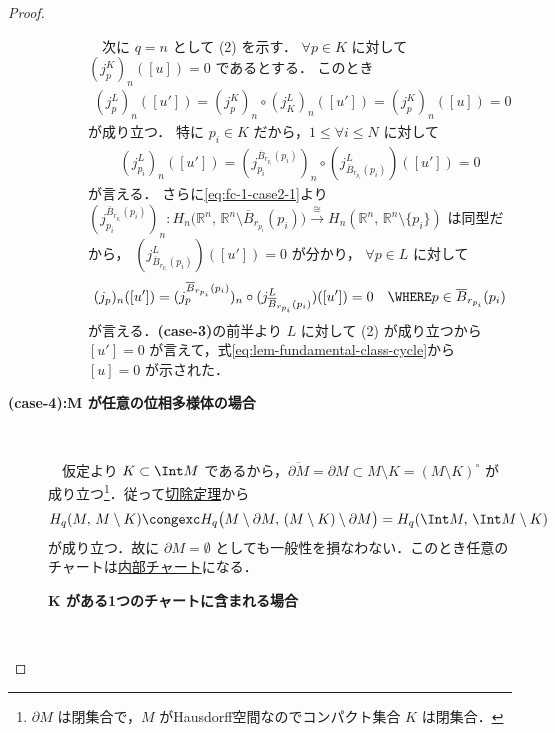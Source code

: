 \documentclass[algtopo_main]{subfiles}
\begin{document}
\begin{proof}
\begin{description}
\begin{description}
            　次に $q = n$ として (2) を示す．
            $\forall p \in K$ に対して $(j_p^K)_n ([u]) = 0$ であるとする．
            このとき
            \begin{align}
                (j_p^L)_n([u']) = (j_p^K)_n \circ (j_K^L)_n([u']) = (j_p^K)_n([u]) = 0
            \end{align}
            が成り立つ．
            特に $p_i \in K$ だから，$1 \le \forall i \le N$ に対して
            \begin{align}
                (j_{p_i}^L)_n ([u']) = (j_{p_i}^{\overline{B}_{r_{p_i}}(p_i)})_n \circ (j_{\overline{B}_{r_{p_i}}(p_i)}^L) ([u']) = 0
            \end{align}
            が言える．
            さらに\eqref{eq:fc-1-case2-1}より $(j_{p_i}^{\overline{B}_{r_{p_i}}(p_i)})_n \colon H_n \bigl( \mathbb{R}^n,\, \mathbb{R}^n \setminus \overline{B}_{r_{p_i}}(p_i) \bigr)  \xrightarrow{\cong} H_n (\mathbb{R}^n,\, \mathbb{R}^n \setminus \{p_i\})$ は同型だから，
            $(j_{\overline{B}_{r_{p_i}}(p_i)}^L) ([u']) = 0$ が分かり，
            $\forall p \in L$ に対して
            \begin{align}
                (j_p)_n([u']) = (j_p^{\overline{B}_{r_{p_i}}(p_i)})_n \circ (j_{\overline{B}_{r_{p_i}}(p_i)}^L)([u']) = 0 \quad \WHERE p \in \overline{B}_{r_{p_i}}(p_i)
            \end{align}
            が言える．\textbf{\textsf{(case-3)}}の前半より $L$ に対して (2) が成り立つから $[u'] = 0$ が言えて，式\eqref{eq:lem-fundamental-class-cycle}から $[u] = 0$ が示された．
        
        \end{description}
    
        \item[\textbf{(case-4):$\bm{M}$ が任意の位相多様体の場合}]　
        
        　仮定より $K \subset \Int M$ であるから，$\overline{\partial M} = \partial M \subset M \setminus K = (M \setminus K)^\circ$ が成り立つ\footnote{$\partial M$ は閉集合で，$M$ がHausdorff空間なのでコンパクト集合 $K$ は閉集合．}．従って\hyperref[thm:exc]{切除定理}から
        \begin{align}
            H_q (M,\, M \setminus K) \congexc H_q\bigl(M \setminus \partial M,\, (M \setminus K) \setminus \partial M\bigr) = H_q(\Int M ,\, \Int M \setminus K)
        \end{align}
        が成り立つ．故に $\partial M = \emptyset$ としても一般性を損なわない．このとき任意のチャートは\hyperref[def:int-manifold-with-boundary]{内部チャート}になる．
        \begin{description}
            \item[\textbf{$\bm{K}$ がある1つのチャートに含まれる場合}]　
            

\end{description}
\end{description}
\end{proof}
\end{document}
